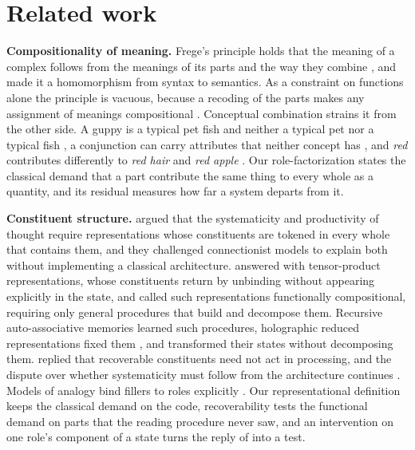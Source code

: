 \documentclass[10pt]{article}
\theoremstyle{plain}
\theoremstyle{remark}
\begin{document}
\section{Related work}
\label{sec:related}

\textbf{Compositionality of meaning.} Frege's principle holds that the meaning of a complex follows from the meanings of its parts and the way they combine \citep{frege1892,frege1923}, and \citet{montague1970} made it a homomorphism from syntax to semantics. As a constraint on functions alone the principle is vacuous, because a recoding of the parts makes any assignment of meanings compositional \citep{zadrozny1994,westerstahl1998}. Conceptual combination strains it from the other side. A guppy is a typical pet fish and neither a typical pet nor a typical fish \citep{osherson1981,fodor1996}, a conjunction can carry attributes that neither concept has \citep{hampton1987}, and \emph{red} contributes differently to \emph{red hair} and \emph{red apple} \citep{kamp1995}. Our role-factorization states the classical demand that a part contribute the same thing to every whole as a quantity, and its residual measures how far a system departs from it.

\textbf{Constituent structure.} \citet{fodor1988} argued that the systematicity and productivity of thought require representations whose constituents are tokened in every whole that contains them, and they challenged connectionist models to explain both without implementing a classical architecture. \citet{smolensky1987,smolensky1990} answered with tensor-product representations, whose constituents return by unbinding without appearing explicitly in the state, and \citet{vangelder1990} called such representations functionally compositional, requiring only general procedures that build and decompose them. Recursive auto-associative memories \citep{pollack1990} learned such procedures, holographic reduced representations fixed them \citep{plate1995}, and \citet{chalmers1990} transformed their states without decomposing them. \citet{fodor1990} replied that recoverable constituents need not act in processing, and the dispute over whether systematicity must follow from the architecture continues \citep{aizawa2003,quiltydunn2023,russin2024,woydt2025,goodale2026}. Models of analogy bind fillers to roles explicitly \citep{hummel1997,doumas2022}. Our representational definition keeps the classical demand on the code, recoverability tests the functional demand on parts that the reading procedure never saw, and an intervention on one role's component of a state turns the reply of \citet{fodor1990} into a test.
\end{document}
